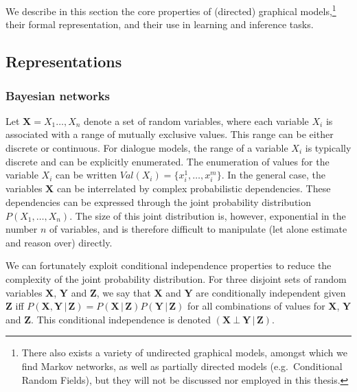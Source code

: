 We describe in this section the core properties of (directed) graphical models,\footnote{There also exists a variety of undirected graphical models, amongst which we find Markov networks, as well as partially directed models (e.g.\ Conditional Random Fields), but they will not be discussed nor employed in this thesis.} their formal representation, and their use in learning and inference tasks. 
 
 \subsection{Representations}
 \label{sec:gm-representation}
\subsubsection*{Bayesian networks}

Let $\mathbf{X} = X_1 \dots, X_n$ denote a set of random variables, where each variable $X_i$ is associated with a range of mutually exclusive values.  This range can be either discrete or continuous.  For dialogue models, the range of a variable $X_i$ is typically discrete and can be explicitly enumerated. The enumeration of values for the variable $X_i$ can be written $\mathit{Val}(X_i) = \{x_i^1, \dots, x_i^m\}$.  
In the general case, the variables $\mathbf{X}$ can be interrelated by complex probabilistic dependencies.  These dependencies can be expressed through the joint probability distribution $P(X_1, \dots, X_n)$.  The size of this joint distribution is, however,  exponential in the number $n$ of variables, and is therefore difficult to manipulate (let alone estimate and reason over) directly. 

We can fortunately exploit conditional independence properties to reduce the complexity of the joint probability distribution.  For three disjoint sets of random variables $\mathbf{X}$, $\mathbf{Y}$ and $\mathbf{Z}$, we say that $\mathbf{X}$ and $\mathbf{Y}$ are conditionally independent given $\mathbf{Z}$ iff $P(\mathbf{X},\mathbf{Y} \, | \, \mathbf{Z}) = P(\mathbf{X} \, | \, \mathbf{Z}) P(\mathbf{Y} \, | \, \mathbf{Z})$ for all combinations of values for  $\mathbf{X}$, $\mathbf{Y}$ and  $\mathbf{Z}$. This conditional independence is denoted $(\mathbf{X} \ \bot \  \mathbf{Y} \, | \,  \mathbf{Z})$. 

